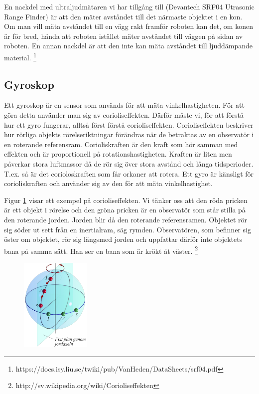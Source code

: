 \documentclass[a4paper,12pt,fleqn]{article}
\begin{document}
En nackdel med ultraljudmätaren vi har tillgång till (Devantech SRF04 Utrasonic Range Finder) är att den mäter avståndet till det närmaste objektet i en kon. Om man vill mäta avståndet till en vägg rakt framför roboten kan det, om konen är för bred, hända att roboten istället mäter avståndet till väggen på sidan av roboten. En annan nackdel är att den inte kan mäta avståndet till ljuddämpande material.
\footnote{https://docs.isy.liu.se/twiki/pub/VanHeden/DataSheets/srf04.pdf}


\subsection{Gyroskop}
Ett gyroskop är en sensor som används för att mäta vinkelhastigheten. För att göra detta använder man sig av corioliseffekten. Därför måste vi, för att förstå hur ett gyro fungerar, alltså först förstå corioliseffekten. Corioliseffekten beskriver hur rörliga objekts rörelseriktningar förändras när de betraktas av en observatör i en roterande referensram. Corioliskraften är den kraft som hör samman med effekten och är proportionell på rotationshastigheten. Kraften är liten men påverkar stora luftmassor då de rör sig över stora avstånd och långa tidsperioder. T.ex. så är det corioloskraften som får orkaner att rotera. Ett gyro är känsligt för corioliskraften och använder sig av den för att mäta vinkelhastighet.

Figur \ref{fig:jord} visar ett exempel på corioliseffekten. Vi tänker oss att den röda pricken är ett objekt i rörelse och den gröna pricken är en observatör som står stilla på den roterande jorden. Jorden blir då den roterande referensramen. Objektet rör sig söder ut sett från en inertialram, säg rymden. Observatören, som befinner sig öster om objektet, rör sig längsmed jorden och uppfattar därför inte objektets bana på samma sätt. Han ser en bana som är krökt åt väster.
\footnote{http://sv.wikipedia.org/wiki/Corioliseffekten}


\begin{figure}[h]
\label{fig:jord}
\caption{}
\includegraphics[width=0.3\textwidth]
{Coriolisjord.png}
\end{figure}
\end{document}
